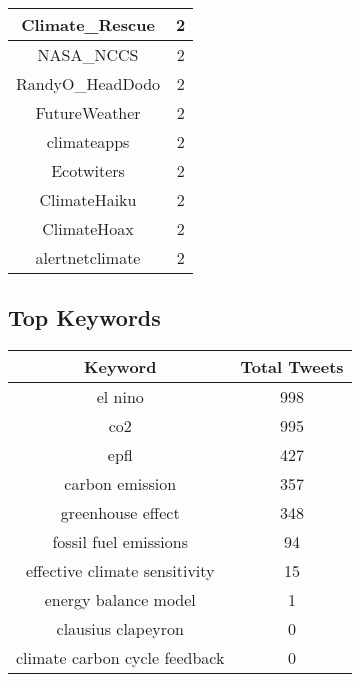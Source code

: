 \documentclass{article}\usepackage[T1]{fontenc}
\begin{document}
\begin{tabular}{|c|c|}
Climate\_Rescue & 2\\ 
 \hline
NASA\_NCCS & 2\\ 
 \hline
RandyO\_HeadDodo & 2\\ 
 \hline
FutureWeather & 2\\ 
 \hline
climateapps & 2\\ 
 \hline
Ecotwiters & 2\\ 
 \hline
ClimateHaiku & 2\\ 
 \hline
ClimateHoax & 2\\ 
 \hline
alertnetclimate & 2\\ 
 \hline
\end{tabular}\subsection*{Top Keywords}\begin{tabular}{|c|c|}         \hline         Keyword & Total Tweets \\ 
 \hline
el nino & 998\\ 
 \hline
co2 & 995\\ 
 \hline
epfl & 427\\ 
 \hline
carbon emission & 357\\ 
 \hline
greenhouse effect & 348\\ 
 \hline
fossil fuel emissions & 94\\ 
 \hline
effective climate sensitivity & 15\\ 
 \hline
energy balance model & 1\\ 
 \hline
clausius clapeyron & 0\\ 
 \hline
climate carbon cycle feedback & 0\\ 
 \hline
\end{tabular}
\end{document}
